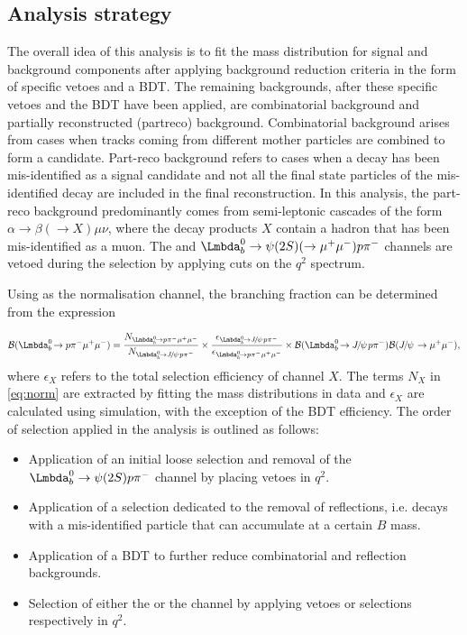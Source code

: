 \subsection{Analysis strategy}
\label{sec:ana}
The overall idea of this analysis is to fit the \Lb mass distribution for signal and background components after applying background reduction criteria in the form of specific vetoes and a BDT. The remaining backgrounds, after these specific vetoes and the BDT have been applied, are combinatorial background and partially reconstructed (\gls{partreco}) background. Combinatorial background arises from cases when tracks coming from different mother particles are combined to form a candidate. Part-reco background refers to cases when a decay has been mis-identified as a signal candidate and not all the final state particles of the mis-identified decay are included in the final reconstruction. In this analysis, the part-reco background predominantly comes from semi-leptonic  cascades of the form $\alpha\to\beta(\to X)\mu\nu$, where the decay products $X$ contain a hadron that has been mis-identified as a muon. The \Lbpijpsi and $\Lb\to\psi(2S)(\to\mumu)\proton\pim$ channels are vetoed during the \Lbpi selection by applying cuts on the $q^{2}$ spectrum.

Using \Lbpijpsi as the normalisation channel,  the \Lbpi branching fraction can be determined from the expression

\begin{equation}
  \BF(\Lbpi) = \frac{N_{\Lbpi}}{N_{\Lbpijpsi}}\times\frac{\epsilon_{\Lbpijpsi}}{\epsilon_{\Lbpi}}\times \BF(\Lbpijpsi)\BF(\jpsi\to\mumu),
  \label{eq:norm}
  \end{equation}
where $\epsilon_{X}$ refers to the total selection efficiency of channel $X$. The terms $N_{X}$ in \autoref{eq:norm} are extracted by fitting the \Lb mass distributions in data and $\epsilon_{X}$ are calculated using simulation, with the exception of the BDT efficiency. The order of selection applied in the analysis is outlined as follows:
\begin{itemize}
  \item Application of an initial loose selection and removal of the $\Lb\to\psi(2S)\proton\pim$ channel by placing vetoes in $q^{2}$.
  \item Application of a selection dedicated to the removal of \gls{reflections}, i.e. decays with a mis-identified particle that can accumulate at a certain $B$ mass.
  \item Application of a BDT to further reduce combinatorial and reflection backgrounds.
    \item Selection of either the \Lbpi or the \Lbpijpsi channel by applying vetoes or selections respectively in $q^{2}$.
\end{itemize}


